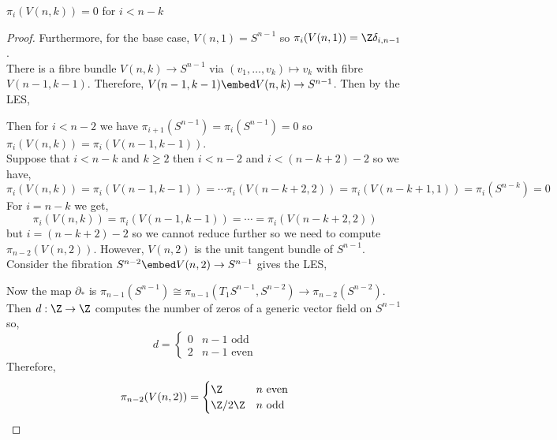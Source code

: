 \documentclass[12pt]{extarticle}
\begin{document}
\begin{lemma}
$\pi_i(V(n, k)) = 0$ for $i < n - k$
\end{lemma}

\begin{proof}
Furthermore, for the base case, $V(n, 1) = S^{n-1}$ so $\pi_i(V(n,1)) = \Z \delta_{i,n-1}$.
\bigskip\\
There is a fibre bundle $V(n, k) \to S^{n-1}$ via $(v_1, \dots, v_k) \mapsto v_k$ with fibre $V(n-1, k-1)$. Therefore, $V(n-1, k-1) \embed V(n,k) \to S^{n-1}$. Then by the LES,
\begin{center}
\end{center}
Then for $i < n - 2$ we have $\pi_{i+1}(S^{n-1}) = \pi_{i}(S^{n-1}) = 0$ so $\pi_i(V(n, k)) = \pi_i(V(n-1, k -1))$.
\bigskip\\
Suppose that $i < n - k$ and $k \ge 2$ then $i < n - 2$ and $i < (n - k + 2) - 2$ so we have,
\[ \pi_i(V(n, k)) = \pi_i(V(n-1, k-1)) = \cdots \pi_i(V(n - k + 2, 2)) = \pi_i(V(n-k + 1, 1)) = \pi_i(S^{n-k}) = 0 \]
For $i = n - k$ we get,
\[ \pi_i(V(n, k)) = \pi_i(V(n-1, k-1)) = \cdots = \pi_i(V(n - k + 2, 2)) \]
but $i = (n - k + 2) - 2$ so we cannot reduce further
so we need to compute $\pi_{n-2}(V(n,2))$. However, $V(n,2)$ is the unit tangent bundle of $S^{n-1}$. Consider the fibration $S^{n-2} \embed V(n,2) \to S^{n-1}$ gives the LES,
\begin{center}
\end{center}
Now the map $\partial_*$ is $\pi_{n-1}(S^{n-1}) \cong \pi_{n-1}(T_1 S^{n-1}, S^{n-2}) \to \pi_{n-2}(S^{n-2})$. Then $d : \Z \to \Z$ computes the number of zeros of a generic vector field on $S^{n-1}$ so,
\[ d = 
\begin{cases}
0 & n - 1 \text{ odd}
\\
2 & n - 1 \text{ even}
\end{cases} \]
Therefore,
\[ \pi_{n-2}(V(n, 2)) = 
\begin{cases}
\Z & n \text{ even}
\\
\Z / 2 \Z & n \text{ odd}
\end{cases} \] 
\end{proof}
\end{document}

